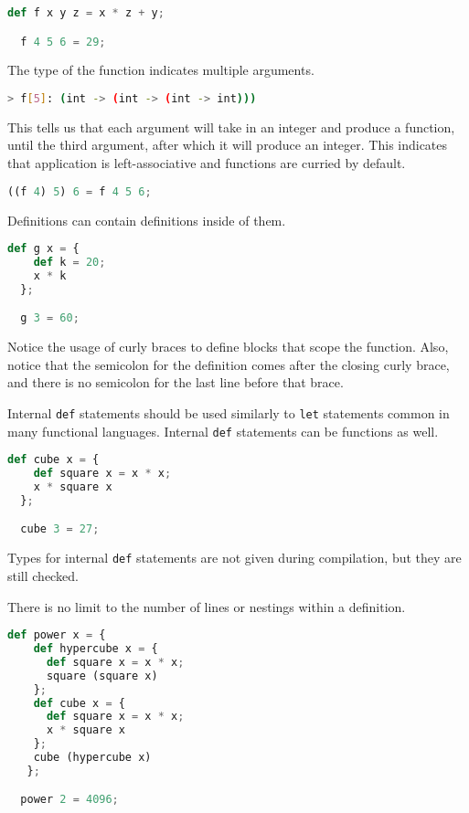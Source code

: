 \begin{lstlisting}[language=Python]
  def f x y z = x * z + y;

  f 4 5 6 = 29;
\end{lstlisting}

The type of the function indicates multiple arguments.

\begin{lstlisting}[language=bash]
  > f[5]: (int -> (int -> (int -> int)))
\end{lstlisting}

This tells us that each argument will take in an integer and produce a function, until the third argument, after which it will produce an integer. This indicates that application is left-associative and functions are curried by default.

\begin{lstlisting}[language=Python]
  ((f 4) 5) 6 = f 4 5 6;
\end{lstlisting}

Definitions can contain definitions inside of them.

\begin{lstlisting}[language=Python]
  def g x = {
    def k = 20;
    x * k
  };

  g 3 = 60;
\end{lstlisting}

Notice the usage of curly braces to define blocks that scope the function. Also, notice that the semicolon for the definition comes after the closing curly brace, and there is no semicolon for the last line before that brace. 

Internal \lstinline{def} statements should be used similarly to \lstinline{let} statements common in many functional languages. Internal \lstinline{def} statements can be functions as well.

\begin{lstlisting}[language=Python]
  def cube x = {
    def square x = x * x;
    x * square x
  };

  cube 3 = 27;
\end{lstlisting}

Types for internal \lstinline{def} statements are not given during compilation, but they are still checked.

There is no limit to the number of lines or nestings within a definition. 

\begin{lstlisting}[language=Python]
  def power x = {
    def hypercube x = {
      def square x = x * x;
      square (square x)
    };
    def cube x = {
      def square x = x * x;
      x * square x
    };
    cube (hypercube x)
   };

  power 2 = 4096;
\end{lstlisting}

